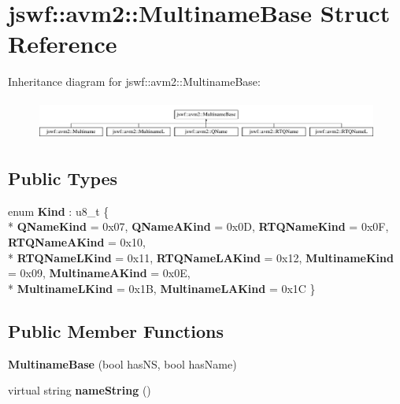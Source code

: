 \hypertarget{structjswf_1_1avm2_1_1_multiname_base}{\section{jswf\+:\+:avm2\+:\+:Multiname\+Base Struct Reference}
\label{structjswf_1_1avm2_1_1_multiname_base}
}
Inheritance diagram for jswf\+:\+:avm2\+:\+:Multiname\+Base\+:\begin{figure}[H]
\begin{center}
\leavevmode
\includegraphics[height=1.325444cm]{structjswf_1_1avm2_1_1_multiname_base}
\end{center}
\end{figure}
\subsection*{Public Types}
\begin{DoxyCompactItemize}
\item 
\hypertarget{structjswf_1_1avm2_1_1_multiname_base_af67080ba9acc59e292400abd42b69243}{enum {\bfseries Kind} \+: u8\+\_\+t \{ \\*
{\bfseries Q\+Name\+Kind} = 0x07, 
{\bfseries Q\+Name\+A\+Kind} = 0x0\+D, 
{\bfseries R\+T\+Q\+Name\+Kind} = 0x0\+F, 
{\bfseries R\+T\+Q\+Name\+A\+Kind} = 0x10, 
\\*
{\bfseries R\+T\+Q\+Name\+L\+Kind} = 0x11, 
{\bfseries R\+T\+Q\+Name\+L\+A\+Kind} = 0x12, 
{\bfseries Multiname\+Kind} = 0x09, 
{\bfseries Multiname\+A\+Kind} = 0x0\+E, 
\\*
{\bfseries Multiname\+L\+Kind} = 0x1\+B, 
{\bfseries Multiname\+L\+A\+Kind} = 0x1\+C
 \}}\label{structjswf_1_1avm2_1_1_multiname_base_af67080ba9acc59e292400abd42b69243}

\end{DoxyCompactItemize}
\subsection*{Public Member Functions}
\begin{DoxyCompactItemize}
\item 
\hypertarget{structjswf_1_1avm2_1_1_multiname_base_a2c8c7cc9522cd9fc943f9cc93fea3da5}{{\bfseries Multiname\+Base} (bool has\+N\+S, bool has\+Name)}\label{structjswf_1_1avm2_1_1_multiname_base_a2c8c7cc9522cd9fc943f9cc93fea3da5}

\item 
\hypertarget{structjswf_1_1avm2_1_1_multiname_base_af307ca34635c309644f43b7d4c4a08e5}{virtual string {\bfseries name\+String} ()}\label{structjswf_1_1avm2_1_1_multiname_base_af307ca34635c309644f43b7d4c4a08e5}

\end{DoxyCompactItemize}
